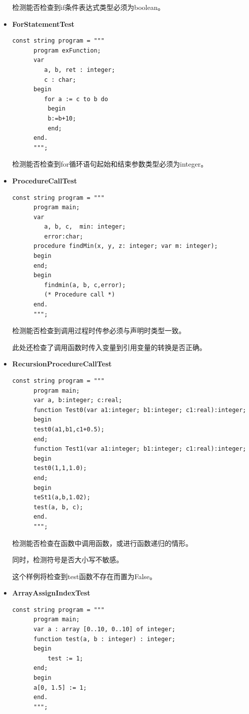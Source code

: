\documentclass[../main.tex]{subfiles}
\begin{document}
\begin{itemize}
检测能否检查到if条件表达式类型必须为boolean。

    \item \textbf{ForStatementTest}
    \begin{lstlisting}[style=csharp]
const string program = """
      program exFunction;
      var
         a, b, ret : integer;
         c : char;
      begin
         for a := c to b do
          begin
          b:=b+10;
          end;
      end.
      """;       
    \end{lstlisting}

检测能否检查到for循环语句起始和结束参数类型必须为integer。

    \item \textbf{ProcedureCallTest}
    \begin{lstlisting}[style=csharp]
const string program = """
      program main;
      var
         a, b, c,  min: integer;
         error:char;
      procedure findMin(x, y, z: integer; var m: integer);
      begin
      end;
      begin
         findmin(a, b, c,error);
         (* Procedure call *)
      end.
      """;
    \end{lstlisting}

检测能否检查到调用过程时传参必须与声明时类型一致。

此处还检查了调用函数时传入变量到引用变量的转换是否正确。

    \item \textbf{RecursionProcedureCallTest}
    \begin{lstlisting}[style=csharp]
const string program = """
      program main;
      var a, b:integer; c:real;
      function Test0(var a1:integer; b1:integer; c1:real):integer;
      begin
      test0(a1,b1,c1+0.5);
      end;
      function Test1(var a1:integer; b1:integer; c1:real):integer;
      begin
      test0(1,1,1.0);
      end;
      begin
      teSt1(a,b,1.02);
      test(a, b, c);
      end.
      """;     
    \end{lstlisting}

检测能否检查在函数中调用函数，或进行函数递归的情形。

同时，检测符号是否大小写不敏感。

这个样例将检查到test函数不存在而置为False。

    \item \textbf{ArrayAssignIndexTest}
    \begin{lstlisting}[style=csharp]
const string program = """
      program main;
      var a : array [0..10, 0..10] of integer;
      function test(a, b : integer) : integer;
      begin
          test := 1;
      end;
      begin
      a[0, 1.5] := 1;
      end.
      """;   
    \end{lstlisting}


\end{itemize}
\end{document}
